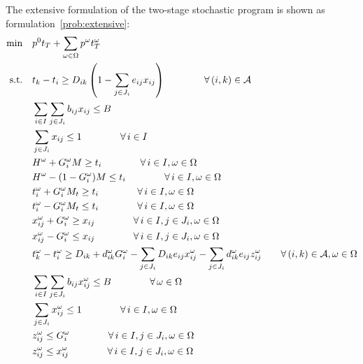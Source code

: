 \documentclass[11pt]{article}
\newcommand{\cA}{{\cal A}}
\begin{document}
		\newline
		The extensive formulation of the two-stage stochastic program is shown as formulation~\eqref{prob:extensive}:
		\begin{subequations} \label{prob:extensive}
			\begin{align}
			\min \quad & p^0 t_T + \sum_{\omega \in \Omega} p^\omega t_T^\omega \\
			\text{s.t.} \quad & t_k - t_i \geq D_{ik} \left ( 1 - \sum_{j \in J_i} e_{ij} x_{ij} \right ) \qquad \qquad \forall \, (i,k) \in \cA \label{cons:Sep}\\
			& \sum_{i \in I} \sum_{j \in J_i} b_{ij}x_{ij} \leq B  \label{cons:Budget}\\
			& \sum_{j \in J_i} x_{ij} \leq 1  \qquad \qquad \forall \,i \in I \label{cons:SingleBudget}\\
			& H^\omega + G_i^\omega M \geq t_i \qquad \qquad \forall \,i \in I, \omega \in \Omega \label{cons:G1}\\
			& H^\omega - (1 - G_i^\omega) M \leq t_i \qquad \qquad \forall \,i \in I, \omega \in \Omega \label{cons:G2}\\
			& t_i^\omega + G_i^\omega M_t \geq t_i \qquad \qquad \forall \,i \in I, \omega \in \Omega \label{cons:tG1}\\
			& t_i^\omega - G_i^\omega M_t \leq t_i \qquad \qquad \forall \,i \in I, \omega \in \Omega \label{cons:tG2}\\
			& x_{ij}^\omega + G_i^\omega \geq x_{ij} \qquad \qquad \forall \,i \in I, j \in J_i, \omega \in \Omega \label{cons:xG1}\\
			& x_{ij}^\omega - G_i^\omega \leq x_{ij} \qquad \qquad \forall \,i \in I, j \in J_i, \omega \in \Omega \label{cons:xG2}\\
			& t_k^\omega - t_i^\omega \geq D_{ik} + d_{ik}^\omega G_i^\omega -\sum_{j \in J_i} D_{ik} e_{ij} x_{ij}^\omega - \sum_{j \in J_i} d_{ik}^\omega e_{ij} z_{ij}^\omega \qquad  \forall \,(i,k) \in \cA, \omega \in \Omega \label{cons:scenSep}\\
			& \sum_{i \in I}\sum_{j \in J_i} b_{ij}x_{ij}^\omega \leq B \qquad \qquad \forall \,\omega \in \Omega \label{cons:scenBudget}\\
			& \sum_{j \in J_i} x_{ij}^\omega \leq 1 \qquad \qquad \forall \,i \in I, \omega \in \Omega \label{cons:scenBudget1}\\
			& z_{ij}^\omega \leq G_i^\omega \qquad \qquad \forall \,i \in I, j \in J_i, \omega \in \Omega \label{cons:linearize1}\\
			& z_{ij}^\omega \leq x_{ij}^\omega \qquad \qquad \forall \,i \in I, j \in J_i, \omega \in \Omega \label{cons:linearize2}\\

\end{align}
\end{subequations}
\end{document}
